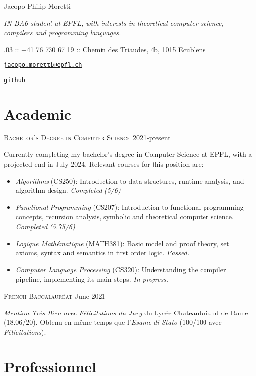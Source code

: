 \documentclass[11pt]{article}
\renewcommand{\url}[1]{{\texttt{#1}}}
\renewcommand{\line}[2]{{\vspace{4pt} \large \noindent\textsc{#1} \hfill #2}\vspace{4pt}}
\begin{document}
  \begin{center}
    \huge Jacopo Philip Moretti
  \end{center}

  \begin{adjustwidth}{1in}{1in}
    \textit{IN BA6 student at EPFL, with interests in theoretical computer science, compilers and programming languages.}

    .03 :: +41 76 730 67 19 :: Chemin des Triaudes, 4b, 1015 Ecublens
    
    \noindent \href{https://people.epfl.ch/jacopo.moretti}{\url{jacopo.moretti@epfl.ch}}
    
    \noindent \href{https://github.com/quartztz}{\url{github}}
  \end{adjustwidth}

  \section*{Academic}

  \line{Bachelor's Degree in Computer Science}{2021-present}

  Currently completing my bachelor's degree in Computer Science at EPFL, with a projected end in July 2024. Relevant courses for this position are: 
  \begin{itemize}
    \item \textit{Algorithms} (CS250): Introduction to data structures, runtime analysis, and algorithm design. \textit{Completed (5/6)}
    \item \textit{Functional Programming} (CS207): Introduction to functional programming concepts, recursion analysis, symbolic and theoretical computer science. \textit{Completed (5.75/6)}
    \item \textit{Logique Mathématique} (MATH381): Basic model and proof theory, set axioms, syntax and semantics in first order logic. \textit{Passed.}
    \item \textit{Computer Language Processing} (CS320): Understanding the compiler pipeline, implementing its main steps. \textit{In progress.}
  \end{itemize}

  \line{French Baccalauréat}{June 2021}

  \textit{Mention Très Bien avec Félicitations du Jury} du Lycée Chateaubriand de Rome (18.06/20). Obtenu en même temps que l'\textit{Esame di Stato} (100/100 avec \textit{Félicitations}).
  
  \section*{Professionnel}
\end{document}
